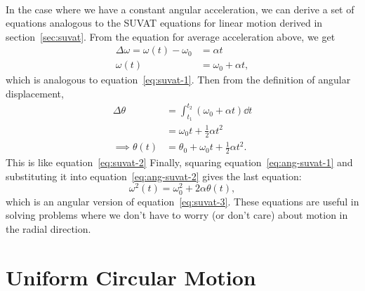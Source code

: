\documentclass[../classical_mechanics.tex]{subfiles}
\begin{document}
        \paragraph{}
        In the case where we have a constant angular acceleration, we can derive a set of equations analogous to the SUVAT equations for linear motion derived in section~\ref{sec:suvat}.
        From the equation for average acceleration above, we get
        \begin{align}
            \Delta\omega=\omega(t)-\omega_0&=\alpha t\\
            \omega(t)&=\omega_0+\alpha t,\label{eq:ang-suvat-1}
        \end{align}
        which is analogous to equation~\ref{eq:suvat-1}.
        Then from the definition of angular displacement,
        \begin{align}
            \Delta\theta&=\int_{t_1}^{t_2}(\omega_0+\alpha t)\dd{t}\\
            &=\omega_0t+\frac{1}{2}\alpha t^2\\
            \implies\theta(t)&=\theta_0+\omega_0t+\frac{1}{2}\alpha t^2.\label{eq:ang-suvat-2}
        \end{align}
        This is like equation~\ref{eq:suvat-2}
        Finally, squaring equation~\ref{eq:ang-suvat-1} and substituting it into equation~\ref{eq:ang-suvat-2} gives the last equation:
        \begin{equation}
            \omega^2(t)=\omega_0^2+2\alpha\theta(t),\label{eq:ang-suvat-3}
        \end{equation}
        which is an angular version of equation~\ref{eq:suvat-3}.
        These equations are useful in solving problems where we don't have to worry (or don't care) about motion in the radial direction.

    \section{Uniform Circular Motion}
\end{document}
